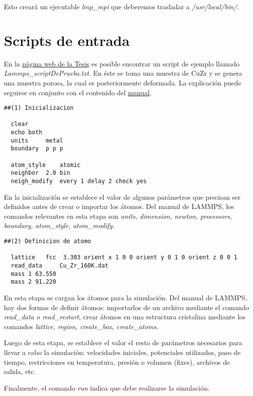 Esto creará un ejecutable \textit{lmp\_mpi} que deberemos trasladar a \textit{/usr/local/bin/}.

\section{Scripts de entrada}
\label{AA_2}

En la \href{https://github.com/francoa/Tesis/tree/master/Resources}{página web de la Tesis} es posible encontrar un script de ejemplo llamado \textit{Lammps\_scriptDePrueba.txt}. En éste se toma una muestra de CuZr y se genera una muestra porosa, la cual es posteriormente deformada. La explicación puede seguirse en conjunto con el contenido del \href{http://lammps.sandia.gov/doc/Section_commands.html#cmd_3}{manual}.

\begin{lstlisting}
##(1) Inicializacion
 
  clear
  echo both
  units		metal
  boundary	p p p
  
  atom_style	atomic
  neighbor	2.0 bin
  neigh_modify	every 1 delay 2 check yes
\end{lstlisting}

En la inicialización se establece el valor de algunos parámetros que precisan ser definidos antes de crear o importar los átomos. Del manual de LAMMPS, los comandos relevantes en esta etapa son \textit{units, dimension, newton, processors, boundary, atom\_style, atom\_modify}.

\begin{lstlisting}
##(2) Definicion de atomo
  
  lattice	fcc  3.303 orient x 1 0 0 orient y 0 1 0 orient z 0 0 1
  read_data     Cu_Zr_160K.dat
  mass 1 63.550
  mass 2 91.220
\end{lstlisting}

En esta etapa se cargan los átomos para la simulación. Del manual de LAMMPS, hay dos formas de definir átomos: importarlos de un archivo mediante el comando \textit{read\_data o read\_restart}, crear átomos en una estructura cristalina mediante los comandos \textit{lattice, region, create\_box, create\_atoms}.

Luego de esta etapa, se establece el valor el resto de parámetros necesarios para llevar a cabo la simulación: velocidades iniciales, potenciales utilizados, paso de tiempo, restricciones en temperatura, presión o volumen (fixes), archivos de salida, etc. 

Finalmente, el comando \textit{run} indica que debe realizarse la simulación.

